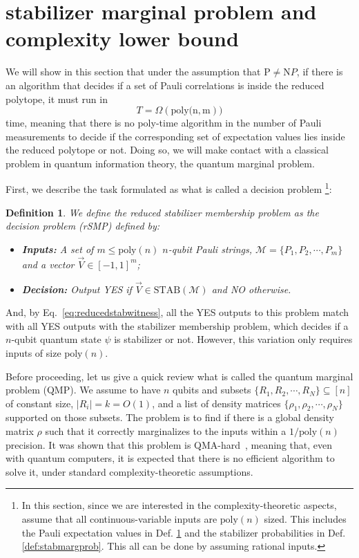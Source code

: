 \documentclass[10pt,aps,pra,twocolumn,floatfix,nofootinbib,superscriptaddress,longbibliography]{revtex4-2}
\newcommand{\1}{\mathbbm{1}}
\newtheorem{defn}{Definition}
\begin{document}
\section{stabilizer marginal problem and complexity lower bound \label{sec:stabmargprob}}
We will show in this section that under the assumption that $\mathrm P \neq \mathrm NP$, if there is an algorithm that decides if a set of Pauli correlations is inside the reduced polytope, it must run in
\begin{equation}
    T =\Omega(\mathrm{poly(n,m} ) )
    \label{eq:complexitylowerbound}
\end{equation}
time, meaning that there is no poly-time algorithm in the number of Pauli measurements to decide if the corresponding set of expectation values lies inside the reduced polytope or not. Doing so, we will make contact with a classical problem in quantum information theory, the quantum marginal problem.

First, we describe the task formulated as what is called a decision problem \footnote{In this section, since we are interested in the complexity-theoretic aspects, assume that all continuous-variable inputs are $\mathrm{poly}(n)$ sized. This includes the Pauli expectation values in Def. \ref{def:stabreducedprob} and the stabilizer probabilities in Def. \ref{def:stabmargprob}. This all can be done by assuming rational inputs.}:
\begin{defn}
    We define the reduced stabilizer membership problem as the decision problem (rSMP) defined by:
    \begin{itemize}
        \item \textbf{Inputs:} A set of $m  \leq \mathrm{poly}(n)$ $n$-qubit Pauli strings, $\mathcal M = \{P_1, P_2, \cdots, P_m\}$ and a vector $\vec{V} \in [-1,1]^m$;
        \item \textbf{Decision:} Output YES if $\vec V \in \mathrm{STAB}(\mathcal M)$ and NO otherwise.
    \end{itemize}
    \label{def:stabreducedprob}
\end{defn}
And, by Eq.~\eqref{eq:reducedstabwitness}, all the YES outputs to this problem match with all YES outputs with the stabilizer membership problem, which decides if a $n$-qubit quantum state $\psi$ is stabilizer or not. However, this variation only requires inputs of size $\mathrm{poly}(n)$.

Before proceeding, let us give a quick review what is called the quantum marginal problem (QMP). We assume to have $n$ qubits and subsets $\{R_1, R_2, \cdots, R_N\}\subseteq [n]$ of constant size, $|R_i|=k=O(1)$, and a list of density matrices $\{\rho_1, \rho_2, \cdots, \rho_N\}$ supported on those subsets. The problem is to find if there is a global density matrix $\rho$ such that it correctly marginalizes to the inputs within a $1/\mathrm{poly}(n)$ precision. It was shown that this problem is QMA-hard~\cite{liu20006consistency}, meaning that, even with quantum computers, it is expected that there is no efficient algorithm to solve it, under standard complexity-theoretic assumptions. 
\end{document}
